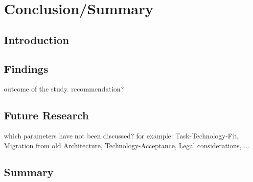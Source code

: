 \chapter{Conclusion/Summary}


\section{Introduction}


\section{Findings}

outcome of the study. recommendation?


\section{Future Research}

which parameters have not been discussed? for example: Task-Technology-Fit, Migration from old Architecture, Technology-Acceptance, Legal considerations, ...


\section{Summary}
